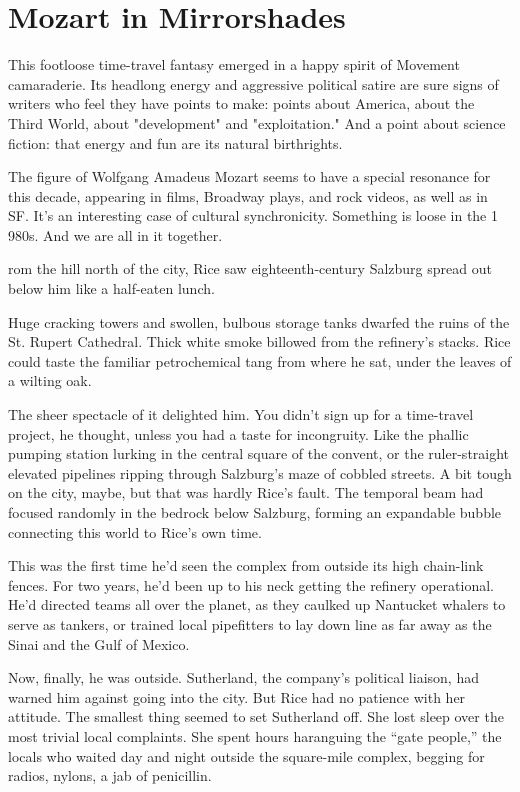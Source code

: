 \chapter{Mozart in Mirrorshades}

This footloose time-travel fantasy emerged in a happy spirit of Movement camaraderie. Its headlong energy and aggressive political satire are sure signs of writers who feel they have points to make: points about America, about the Third World, about "development" and "exploitation." And a point about science fiction: that energy and fun are its natural birthrights.

The figure of Wolfgang Amadeus Mozart seems to have a special resonance for this decade, appearing in films, Broadway plays, and rock videos, as well as in SF. It's an interesting case of cultural synchronicity. Something is loose in the 1 980s. And we are all in it together.

\hrulefill

rom the hill north of the city, Rice saw eighteenth-century Salzburg spread out below him like a half-eaten lunch.

Huge cracking towers and swollen, bulbous storage tanks dwarfed the ruins of the St. Rupert Cathedral. Thick white smoke billowed from the refinery's stacks. Rice could taste the familiar petrochemical tang from where he sat, under the leaves of a wilting oak.

The sheer spectacle of it delighted him. You didn't sign up for a time-travel project, he thought, unless you had a taste for incongruity. Like the phallic pumping station lurking in the central square of the convent, or the ruler-straight elevated pipelines ripping through Salzburg's maze of cobbled streets. A bit tough on the city, maybe, but that was hardly Rice's fault. The temporal beam had focused randomly in the bedrock below Salzburg, forming an expandable bubble connecting this world to Rice's own time.

This was the first time he'd seen the complex from outside its high chain-link fences. For two years, he'd been up to his neck getting the refinery operational. He'd directed teams all over the planet, as they caulked up Nantucket whalers to serve as tankers, or trained local pipefitters to lay down line as far away as the Sinai and the Gulf of Mexico.

Now, finally, he was outside. Sutherland, the company's political liaison, had warned him against going into the city. But Rice had no patience with her attitude. The smallest thing seemed to set Sutherland off. She lost sleep over the most trivial local complaints. She spent hours haranguing the ``gate people,'' the locals who waited day and night outside the square-mile complex, begging for radios, nylons, a jab of penicillin.

